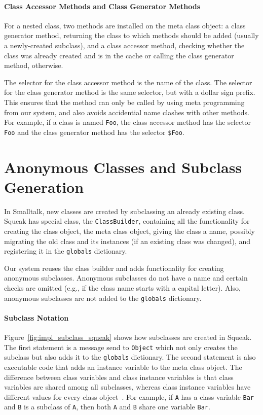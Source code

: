 \paragraph{Class Accessor Methods and Class Generator Methods}
For a nested class, two methods are installed on the meta class object: a class generator method, returning the class to which methods should be added (usually a newly-created subclass), and a class accessor method, checking whether the class was already created and is in the cache or calling the class generator method, otherwise.

The selector for the class accessor method is the name of the class. The selector for the class generator method is the same selector, but with a dollar sign prefix. This ensures that the method can only be called by using meta programming from our system, and also avoids accidential name clashes with other methods. For example, if a class is named \texttt{Foo}, the class accessor method has the selector \texttt{Foo} and the class generator method has the selector \texttt{\$Foo}.

\section{Anonymous Classes and Subclass Generation}
In Smalltalk, new classes are created by subclassing an already existing class. Squeak has special class, the \texttt{ClassBuilder}, containing all the functionality for creating the class object, the meta class object, giving the class a name, possibly migrating the old class and its instances (if an existing class was changed), and registering it in the \texttt{globals} dictionary.

Our system reuses the class builder and adds functionality for creating anonymous subclasses. Anonymous subclasses do not have a name and certain checks are omitted (e.g., if the class name starts with a capital letter). Also, anonymous subclasses are not added to the \texttt{globals} dictionary.

\paragraph{Subclass Notation}
Figure~\ref{fig:impl_subclass_squeak} shows how subclasses are created in Squeak. The first statement is a message send to \texttt{Object} which not only creates the subclass but also adds it to the \texttt{globals} dictionary. The second statement is also executable code that adds an instance variable to the meta class object. The difference between class variables and class instance variables is that class variables are shared among all subclasses, whereas class instance variables have different values for every class object~\cite{classvar1,classvar2}. For example, if \texttt{A} has a class variable \texttt{Bar} and \texttt{B} is a subclass of \texttt{A}, then both \texttt{A} and \texttt{B} share one variable \texttt{Bar}.

